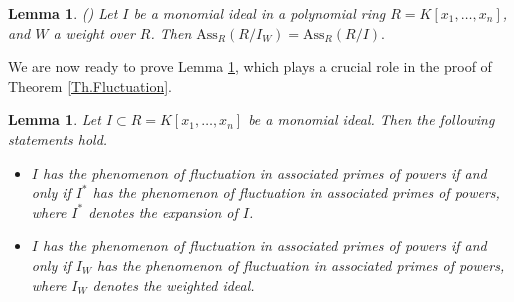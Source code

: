 \documentclass[11pt]{amsart}
\newtheorem{lemma}[theorem]{Lemma}
\begin{document}
\begin{lemma}\label{ASS-Weighted} (\cite[Lemma 3.9]{SN})
Let $I$  be a monomial ideal in a polynomial ring $R=K[x_1, \ldots, x_n]$, and $W$ a weight over $R$. Then 
$\mathrm{Ass}_R(R/I_W)=\mathrm{Ass}_R(R/I).$
\end{lemma}



We are now ready to prove Lemma \ref{Lem.Fluctuation}, which plays a crucial role in the proof of Theorem \ref{Th.Fluctuation}.



\begin{lemma}\label{Lem.Fluctuation} 
Let  $I \subset R=K[x_1, \ldots, x_n]$ be a monomial ideal.  Then the following statements hold.
\begin{itemize}
\item[(1)] $I$ has the  phenomenon  of  fluctuation in associated primes of powers   if and only if $I^*$ has the  phenomenon  of  fluctuation in
associated primes of powers,   where $I^*$ denotes the  expansion of $I$.  
\item[(2)] $I$  has the  phenomenon  of  fluctuation in associated primes of powers   if and only if $I_W$ has the  phenomenon  of  fluctuation in
associated primes of powers,  where $I_W$ denotes the  weighted ideal.    
\end{itemize}
\end{lemma}
\end{document}

